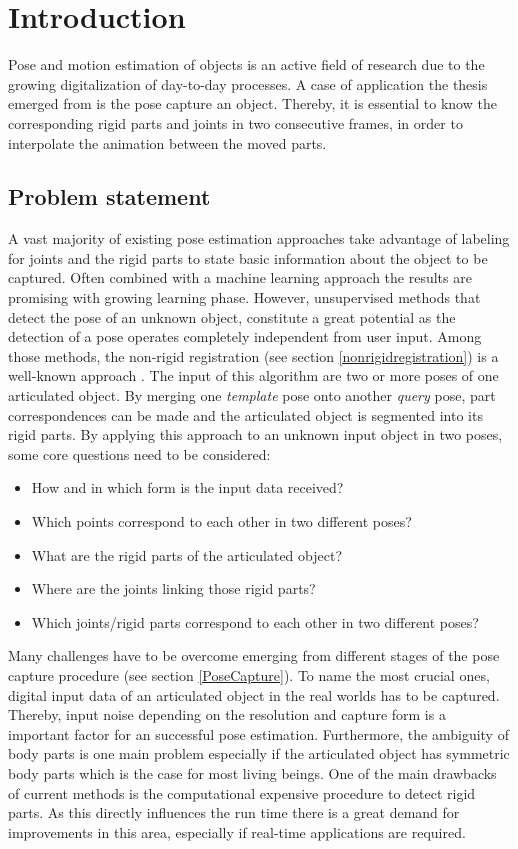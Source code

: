 \chapter{Introduction}
\label{cha:Introduction}

Pose and motion estimation of objects is an active field of research due to the growing digitalization of day-to-day processes. A case of application the thesis emerged from is the pose capture an object. Thereby, it is essential to know the corresponding rigid parts and joints in two consecutive frames, in order to interpolate the animation between the moved parts.

\section{Problem statement}
A vast majority of existing pose estimation approaches take advantage of labeling for joints and the rigid parts to state basic information about the object to be captured. Often combined with a machine learning approach the results are promising with growing learning phase. However, unsupervised methods that detect the pose of an unknown object, constitute a great potential as the detection of a pose operates completely independent from user input. Among those methods, the non-rigid registration \cite{survey} (see section \ref{nonrigidregistration}) is a well-known approach . The input of this algorithm are two or more poses of one articulated object. By merging one \textit{template} pose onto another \textit{query} pose, part correspondences can be made and the articulated object is segmented into its rigid parts. 
By applying this approach to an unknown input object in two poses, some core questions need to be considered:
\\\begin{itemize}
	\item How and in which form is the input data received?
	\item Which points correspond to each other in two different poses?
	\item What are the rigid parts of the articulated object?
	\item Where are the joints linking those rigid parts?
	\item Which joints/rigid parts correspond to each other in two different poses?
\end{itemize}
Many challenges have to be overcome emerging from different stages of the pose capture procedure (see section \ref{PoseCapture}). To name the most crucial ones, digital input data of an articulated object in the real worlds has to be captured. Thereby, input noise depending on the resolution and capture form is a important factor for an successful pose estimation. Furthermore, the ambiguity of body parts is one main problem especially if the articulated object has symmetric body parts which is the case for most living beings. One of the main drawbacks of current methods is the computational expensive procedure to detect rigid parts. As this directly influences the run time there is a great demand for improvements in this area, especially if real-time applications are required.

